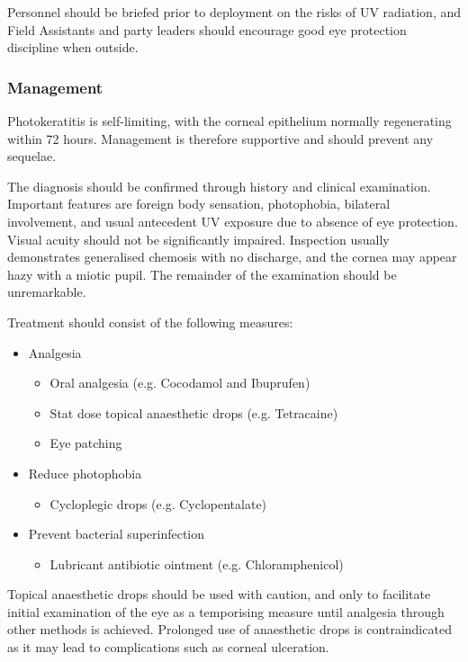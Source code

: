\documentclass[12pt,a4paper]{article}
\begin{document}
Personnel should be briefed prior to deployment on the risks of UV radiation, and Field Assistants and party leaders should encourage good eye protection discipline when outside.

\subsubsection{Management}

Photokeratitis is self-limiting, with the corneal epithelium normally regenerating within 72 hours. Management is therefore supportive and should prevent any sequelae.

The diagnosis should be confirmed through history and clinical examination. Important features are foreign body sensation, photophobia, bilateral involvement, and usual antecedent UV exposure due to absence of eye protection. Visual acuity should not be significantly impaired. Inspection usually demonstrates generalised chemosis with no discharge, and the cornea may appear hazy with a miotic pupil. The remainder of the examination should be unremarkable.\cite{Auerbach:2012tq}

Treatment should consist of the following measures:\cite{Auerbach:2012tq}

\begin{itemize}
    \item Analgesia
    \begin{itemize}
        \item Oral analgesia (e.g. Cocodamol and Ibuprufen)
        \item Stat dose topical anaesthetic drops (e.g. Tetracaine)
        \item Eye patching
    \end{itemize}
    \item Reduce photophobia
    \begin{itemize}
        \item Cycloplegic drops (e.g. Cyclopentalate)
    \end{itemize}
    \item Prevent bacterial superinfection
    \begin{itemize}
        \item Lubricant antibiotic ointment (e.g. Chloramphenicol)
    \end{itemize}
\end{itemize}

Topical anaesthetic drops should be used with caution, and only to facilitate initial examination of the eye as a temporising measure until analgesia through other methods is achieved. Prolonged use of anaesthetic drops is contraindicated as it may lead to complications such as corneal ulceration.\cite{Patel:2013ki}
\end{document}
